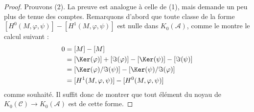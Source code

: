 \begin{proof}
\medskip\noindent
Prouvons (2). La preuve est analogue à celle de (1), mais demande un peu
plus de tenue des comptes. Remarquons d'abord que toute classe de la forme
$[H^0(M, \varphi, \psi)] - [H^1(M, \varphi, \psi)]$ est nulle
dans $K_0(\mathcal{A})$, comme le montre le calcul suivant :
\begin{align*}
0 & = [M] - [M] \\
& =  [\Ker(\varphi)] + [\Im(\varphi)]
- [\Ker(\psi)] - [\Im(\psi)] \\
& =
[\Ker(\varphi)/\Im(\psi)] -
[\Ker(\psi)/\Im(\varphi)] \\
& = [H^1(M, \varphi, \psi)] - [H^0(M, \varphi, \psi)]
\end{align*}
comme souhaité. Il suffit donc de montrer que tout élément du noyau
de $K_0(\mathcal{C}) \to K_0(\mathcal{A})$ est de cette forme.


\end{proof}
